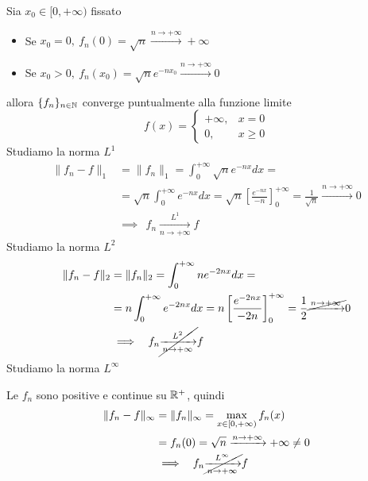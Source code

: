 Sia $x_{0} \in [ 0,+\infty )$ fissato
\begin{itemize}
\item Se $x_{0} =0,\ f_{n}( 0) =\sqrt{n}\xrightarrow{n\rightarrow +\infty } +\infty $
\item Se $x_{0}  >0,\ f_{n}( x_{0}) =\sqrt{n} e^{-nx_{0}}\xrightarrow{n\rightarrow +\infty } 0$
\end{itemize}
allora $\{f_{n}\}_{n\in \mathbb{N} }$ converge puntualmente alla funzione limite
\begin{equation*}
f( x) =\begin{cases}
+\infty , & x=0\\
0, & x\geqslant 0
\end{cases}
\end{equation*}
Studiamo la norma $L^{1}$
\begin{equation*}
\begin{aligned}
\| f_{n} -f\| _{1} & =\| f_{n} \| _{1} =\int ^{+\infty }_{0}\sqrt{n} e^{-nx} dx=\\
 & =\sqrt{n}\int ^{+\infty }_{0} e^{-nx} dx=\sqrt{n}\left[\frac{e^{-nx}}{-n}\right]^{+\infty }_{0} =\frac{1}{\sqrt{n}}\xrightarrow{n\rightarrow +\infty } 0\\
 & \implies \ \ f_{n}\xrightarrow[n\rightarrow +\infty ]{L^{1}} f
\end{aligned}
\end{equation*}
Studiamo la norma $L^{2}$
\begin{equation*}
\begin{aligned}
\| f_{n} -f\| _{2} & =\| f_{n} \| _{2} =\int ^{+\infty }_{0} ne^{-2nx} dx=\\
 & =n\int ^{+\infty }_{0} e^{-2nx} dx=n\left[\frac{e^{-2nx}}{-2n}\right]^{+\infty }_{0} =\frac{1}{2}\cancel{\xrightarrow{n\rightarrow +\infty }} 0\\
 & \implies \ \ f_{n}\cancel{\xrightarrow[n\rightarrow +\infty ]{L^{2}}} f
\end{aligned}
\end{equation*}
Studiamo la norma $L^{\infty }$

Le $f_{n}$ sono positive e continue su $\mathbb{R} ^{+}$, quindi
\begin{equation*}
\begin{aligned}
\| f_{n} -f\| _{\infty } & =\| f_{n} \| _{\infty } =\max_{x\in [ 0,+\infty )} f_{n}( x)\\
 & =f_{n}( 0) =\sqrt{n}\xrightarrow{n\rightarrow +\infty } +\infty \neq 0\\
 & \implies \ \ f_{n}\cancel{\xrightarrow[n\rightarrow +\infty ]{L^{\infty }}} f
\end{aligned}
\end{equation*}
\Soluzione

